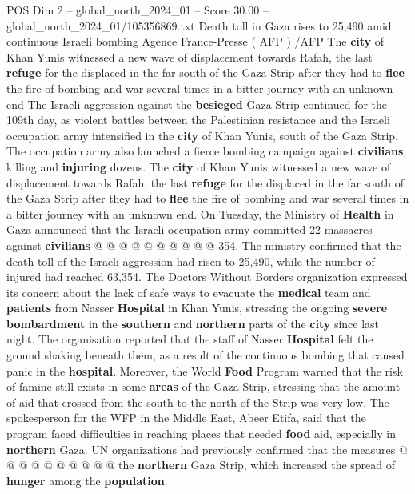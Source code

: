 \begin{textsample}{POS Dim 2 – global\_north\_2024\_01 – Score 30.00 – global\_north\_2024\_01/105356869.txt}  \label{ex:f2_pos_209}
Death toll in Gaza rises to 25,490 amid continuous Israeli bombing Agence France-Presse ( AFP ) /AFP The \textbf{city} of Khan Yunis witnessed a new wave of displacement towards Rafah, the last \textbf{refuge} for the displaced in the far south of the Gaza Strip after they had to \textbf{flee} the fire of bombing and war several times in a bitter journey with an unknown end The Israeli aggression against the \textbf{besieged} Gaza Strip continued for the 109th day, as violent battles between the Palestinian resistance and the Israeli occupation army intensified in the \textbf{city} of Khan Yunis, south of the Gaza Strip.
The occupation army also launched a fierce bombing campaign against \textbf{civilians}, killing and \textbf{injuring} dozens.
The \textbf{city} of Khan Yunis witnessed a new wave of displacement towards Rafah, the last \textbf{refuge} for the displaced in the far south of the Gaza Strip after they had to \textbf{flee} the fire of bombing and war several times in a bitter journey with an unknown end.
On Tuesday, the Ministry of \textbf{Health} in Gaza announced that the Israeli occupation army committed 22 massacres against \textbf{civilians} @ @ @ @ @ @ @ @ @ @ 354.
The ministry confirmed that the death toll of the Israeli aggression had risen to 25,490, while the number of injured had reached 63,354.
The Doctors Without Borders organization expressed its concern about the lack of safe ways to evacuate the \textbf{medical} team and \textbf{patients} from Nasser \textbf{Hospital} in Khan Yunis, stressing the ongoing \textbf{severe} \textbf{bombardment} in the \textbf{southern} and \textbf{northern} parts of the \textbf{city} since last night.
The organisation reported that the staff of Nasser \textbf{Hospital} felt the ground shaking beneath them, as a result of the continuous bombing that caused panic in the \textbf{hospital}.
Moreover, the World \textbf{Food} Program warned that the risk of famine still exists in some \textbf{areas} of the Gaza Strip, stressing that the amount of aid that crossed from the south to the north of the Strip was very low.
The spokesperson for the WFP in the Middle East, Abeer Etifa, said that the program faced difficulties in reaching places that needed \textbf{food} aid, especially in \textbf{northern} Gaza.
UN organizations had previously confirmed that the measures @ @ @ @ @ @ @ @ @ @ the \textbf{northern} Gaza Strip, which increased the spread of \textbf{hunger} among the \textbf{population}.

\end{textsample}
